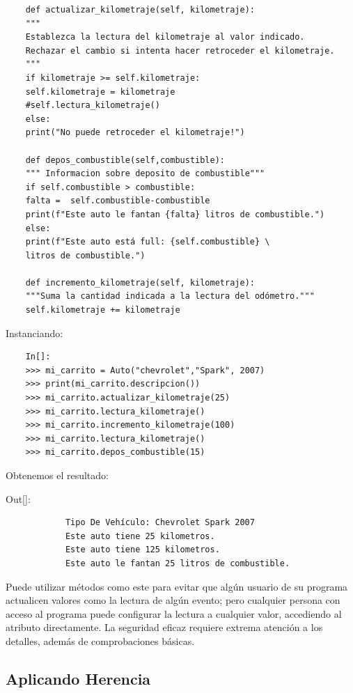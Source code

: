 {\begin{lstlisting}
	def actualizar_kilometraje(self, kilometraje):
	"""
	Establezca la lectura del kilometraje al valor indicado.
	Rechazar el cambio si intenta hacer retroceder el kilometraje.
	"""
	if kilometraje >= self.kilometraje:
	self.kilometraje = kilometraje
	#self.lectura_kilometraje()
	else:
	print("No puede retroceder el kilometraje!")
	
	def depos_combustible(self,combustible):
	""" Informacion sobre deposito de combustible"""
	if self.combustible > combustible:
	falta =  self.combustible-combustible
	print(f"Este auto le fantan {falta} litros de combustible.")
	else:
	print(f"Este auto está full: {self.combustible} \
	litros de combustible.")             
	
	def incremento_kilometraje(self, kilometraje):
	"""Suma la cantidad indicada a la lectura del odómetro."""
	self.kilometraje += kilometraje
\end{lstlisting}Instanciando:

\begin{lstlisting}
	In[]:
	>>> mi_carrito = Auto("chevrolet","Spark", 2007)
	>>> print(mi_carrito.descripcion())
	>>> mi_carrito.actualizar_kilometraje(25)
	>>> mi_carrito.lectura_kilometraje()
	>>> mi_carrito.incremento_kilometraje(100)
	>>> mi_carrito.lectura_kilometraje()
	>>> mi_carrito.depos_combustible(15)
\end{lstlisting}Obtenemos el resultado:\vspace{0.08cm}

{\ttfamily\scriptsize \noindent Out[]:\vspace{-0.3cm}	
	{\color{blue} 	
		\begin{verbatim}
			Tipo De Vehículo: Chevrolet Spark 2007 
			Este auto tiene 25 kilometros.
			Este auto tiene 125 kilometros.
			Este auto le fantan 25 litros de combustible.
		\end{verbatim}
}}



Puede utilizar métodos como este para evitar que algún usuario de su programa actualicen valores como la lectura de algún evento; pero cualquier persona con acceso al programa puede configurar la lectura a cualquier valor, accediendo al atributo directamente. La seguridad eficaz requiere extrema atención a los detalles, además de comprobaciones básicas.



\subsection{Aplicando Herencia}

}
